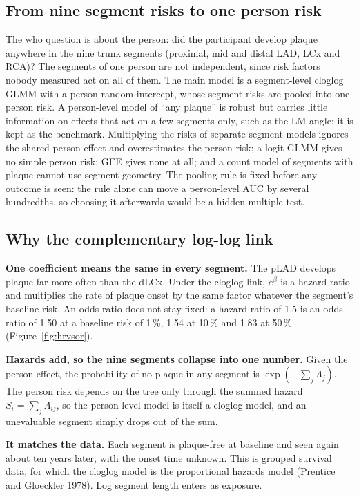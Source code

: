 \subsection*{From nine segment risks to one person risk}
The who question is about the person: did the participant develop plaque anywhere in the nine trunk
segments (proximal, mid and distal LAD, LCx and RCA)? The segments of one person are not independent,
since risk factors nobody measured act on all of them. The main model is a segment-level cloglog GLMM
with a person random intercept, whose segment risks are pooled into one person risk. A person-level
model of ``any plaque'' is robust but carries little information on effects that act on a few
segments only, such as the LM angle; it is kept as the benchmark. Multiplying the risks of separate
segment models ignores the shared person effect and overestimates the person risk; a logit GLMM gives
no simple person risk; GEE gives none at all; and a count model of segments with plaque cannot use
segment geometry. The pooling rule is fixed before any outcome is seen: the rule alone can move a
person-level AUC by several hundredths, so choosing it afterwards would be a hidden multiple test.

\subsection*{Why the complementary log-log link}
\textbf{One coefficient means the same in every segment.} The pLAD develops plaque far more often than
the dLCx. Under the cloglog link, $e^{\beta}$ is a hazard ratio and multiplies the rate of plaque onset
by the same factor whatever the segment's baseline risk. An odds ratio does not stay fixed: a hazard
ratio of 1.5 is an odds ratio of 1.50 at a baseline risk of 1\,\%, 1.54 at 10\,\% and 1.83 at 50\,\%
(Figure~\ref{fig:hrvsor}).

\textbf{Hazards add, so the nine segments collapse into one number.} Given the person effect, the
probability of no plaque in any segment is $\exp(-\sum_j \Lambda_j)$. The person risk depends on the
tree only through the summed hazard $S_i = \sum_j \Lambda_{ij}$, so the person-level model is itself a
cloglog model, and an unevaluable segment simply drops out of the sum.

\textbf{It matches the data.} Each segment is plaque-free at baseline and seen again about ten years
later, with the onset time unknown. This is grouped survival data, for which the cloglog model is the
proportional hazards model (Prentice and Gloeckler 1978). Log segment length enters as exposure.

